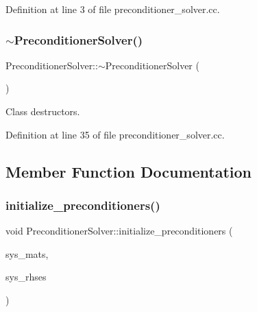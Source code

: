Definition at line 3 of file preconditioner\+\_\+solver.\+cc.

\mbox{\label{class_preconditioner_solver_a8418873c20ded98dc1af3f66880d8e91}} 
\subsubsection{\texorpdfstring{$\sim$\+Preconditioner\+Solver()}{~PreconditionerSolver()}}
{\footnotesize\ttfamily Preconditioner\+Solver\+::$\sim$\+Preconditioner\+Solver (\begin{DoxyParamCaption}{ }\end{DoxyParamCaption})}



Class destructors. 



Definition at line 35 of file preconditioner\+\_\+solver.\+cc.



\subsection{Member Function Documentation}
\mbox{\label{class_preconditioner_solver_adfb504161a00566d8adc3534d58b3611}} 
\subsubsection{\texorpdfstring{initialize\+\_\+preconditioners()}{initialize\_preconditioners()}}
{\footnotesize\ttfamily void Preconditioner\+Solver\+::initialize\+\_\+preconditioners (\begin{DoxyParamCaption}\item[{std\+::vector$<$ P\+E\+T\+Sc\+Wrappers\+::\+M\+P\+I\+::\+Sparse\+Matrix $\ast$$>$ \&}]{sys\+\_\+mats,  }\item[{std\+::vector$<$ P\+E\+T\+Sc\+Wrappers\+::\+M\+P\+I\+::\+Vector $\ast$$>$ \&}]{sys\+\_\+rhses }\end{DoxyParamCaption})}

